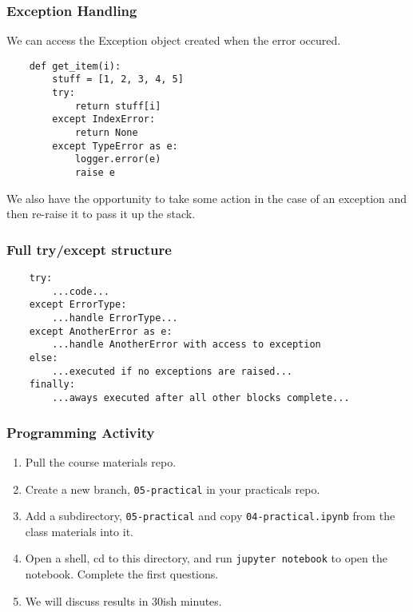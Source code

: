 \documentclass[10pt]{beamer}
\begin{document}
\begin{frame}[fragile]
  \frametitle{Exception Handling}
  
  We can access the Exception object created when the error occured.
  
  \vspace{5mm}
  \begin{verbatim}
    def get_item(i):
        stuff = [1, 2, 3, 4, 5]
        try:
            return stuff[i]
        except IndexError:
            return None
        except TypeError as e:
            logger.error(e)
            raise e        
  \end{verbatim}
  
  \vspace{5mm}
  We also have the opportunity to take some action in the case of an exception and then 
  re-raise it to pass it up the stack.
   
\end{frame}


\begin{frame}[fragile]
  \frametitle{Full try/except structure}
  

  \begin{verbatim}
    try:
        ...code...
    except ErrorType:
        ...handle ErrorType...
    except AnotherError as e:
        ...handle AnotherError with access to exception
    else:
        ...executed if no exceptions are raised...
    finally:
        ...aways executed after all other blocks complete...                
  \end{verbatim}
  
  \vspace{5mm}
  \end{frame}

\begin{frame}
  \frametitle{Programming Activity}
  
  \begin{enumerate}
    \item Pull the course materials repo.
    \item Create a new branch, \texttt{05-practical} in your practicals repo.
    \item Add a subdirectory,  \texttt{05-practical} and copy \texttt{04-practical.ipynb} from the class materials into it.
    \item Open a shell, cd to this directory, and run \texttt{jupyter notebook} to open the notebook. Complete the first questions.
    \item We will discuss results in 30ish minutes.
  \end{enumerate}      
\end{frame}
\end{document}
